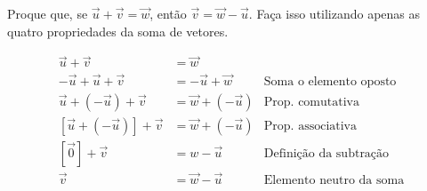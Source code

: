 
\begin{question}
  Proque que, se $\vec u + \vec v = \vec w$, então $\vec v = \vec w - \vec u$.
  Faça isso utilizando apenas as quatro propriedades da soma de vetores.

  \begin{solution}
    \begin{align*}
      \vec u + \vec v &= \vec w &\\
      -\vec u + \vec u + \vec v &= -\vec u + \vec w &\text{Soma o elemento oposto}\\
      \vec u + \left(-\vec u\right) + \vec v &= \vec w + \left(-\vec u\right) &\text{Prop. comutativa}\\
      \left[\vec u + \left(-\vec u\right)\right] + \vec v &= \vec w + \left(-\vec u\right) &\text{Prop. associativa}\\
      \left[\vec 0\right] + \vec v &= w - \vec u &\text{Definição da subtração}\\
      \vec v &= \vec w - \vec u &\text{Elemento neutro da soma}
    \end{align*}
  \end{solution}
\end{question}
